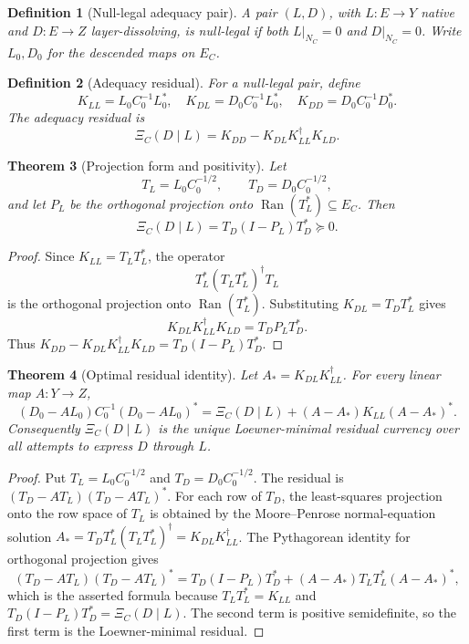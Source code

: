 \documentclass[11pt]{article}
\newtheorem{theorem}{Theorem}[section]
\newtheorem{definition}[theorem]{Definition}
\DeclareMathOperator{\Ran}{Ran}
\begin{document}
\begin{definition}[Null-legal adequacy pair]
A pair \((L,D)\), with \(L:E\to Y\) native and \(D:E\to Z\) layer-dissolving, is null-legal if both \(L|_{N_C}=0\) and \(D|_{N_C}=0\).  Write \(L_0,D_0\) for the descended maps on \(E_C\).
\end{definition}

\begin{definition}[Adequacy residual]
For a null-legal pair, define
\[
  K_{LL}=L_0C_0^{-1}L_0^*,\quad
  K_{DL}=D_0C_0^{-1}L_0^*,\quad
  K_{DD}=D_0C_0^{-1}D_0^*.
\]
The adequacy residual is
\[
  \boxed{\Xi_C(D\mid L)=K_{DD}-K_{DL}K_{LL}^\dagger K_{LD}.}
\]
\end{definition}

\begin{theorem}[Projection form and positivity]
Let
\[
  T_L=L_0C_0^{-1/2},\qquad T_D=D_0C_0^{-1/2},
\]
and let \(P_L\) be the orthogonal projection onto \(\Ran(T_L^*)\subseteq E_C\).  Then
\[
  \boxed{\Xi_C(D\mid L)=T_D(I-P_L)T_D^*\succeq0.}
\]
\end{theorem}

\begin{proof}
Since \(K_{LL}=T_LT_L^*\), the operator
\[
  T_L^*(T_LT_L^*)^\dagger T_L
\]
is the orthogonal projection onto \(\Ran(T_L^*)\).  Substituting \(K_{DL}=T_DT_L^*\) gives
\[
  K_{DL}K_{LL}^\dagger K_{LD}=T_D P_L T_D^*.
\]
Thus \(K_{DD}-K_{DL}K_{LL}^\dagger K_{LD}=T_D(I-P_L)T_D^*\).
\end{proof}

\begin{theorem}[Optimal residual identity]
Let \(A_*=K_{DL}K_{LL}^\dagger\).  For every linear map \(A:Y\to Z\),
\[
  (D_0-AL_0)C_0^{-1}(D_0-AL_0)^*
  =\Xi_C(D\mid L)+(A-A_*)K_{LL}(A-A_*)^*.
\]
Consequently \(\Xi_C(D\mid L)\) is the unique Loewner-minimal residual currency over all attempts to express \(D\) through \(L\).
\end{theorem}

\begin{proof}
Put \(T_L=L_0C_0^{-1/2}\) and \(T_D=D_0C_0^{-1/2}\).  The residual is \((T_D-AT_L)(T_D-AT_L)^*\).  For each row of \(T_D\), the least-squares projection onto the row space of \(T_L\) is obtained by the Moore--Penrose normal-equation solution \(A_*=T_DT_L^*(T_LT_L^*)^\dagger=K_{DL}K_{LL}^\dagger\).  The Pythagorean identity for orthogonal projection gives
\[
  (T_D-AT_L)(T_D-AT_L)^*
  =T_D(I-P_L)T_D^*+(A-A_*)T_LT_L^*(A-A_*)^*,
\]
which is the asserted formula because \(T_LT_L^*=K_{LL}\) and \(T_D(I-P_L)T_D^*=\Xi_C(D\mid L)\).  The second term is positive semidefinite, so the first term is the Loewner-minimal residual.
\end{proof}
\end{document}
